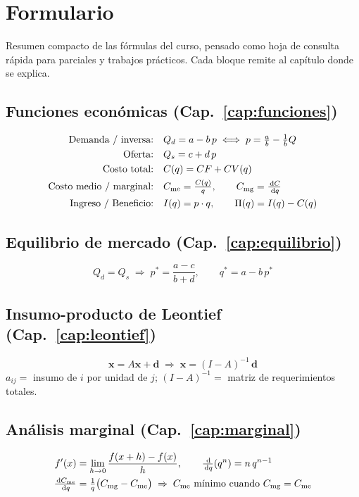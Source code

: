 \chapter{Formulario}
\label{ap:formulario}

Resumen compacto de las fórmulas del curso, pensado como hoja de consulta rápida para parciales y trabajos prácticos. Cada bloque remite al capítulo donde se explica.

\section*{Funciones económicas (Cap.~\ref{cap:funciones})}
\begin{align*}
\text{Demanda / inversa:}\quad & Q_d = a - b\,p \;\Longleftrightarrow\; p = \tfrac{a}{b} - \tfrac{1}{b}Q \\
\text{Oferta:}\quad & Q_s = c + d\,p \\
\text{Costo total:}\quad & C(q) = CF + CV(q) \\
\text{Costo medio / marginal:}\quad & C_{\mathrm{me}} = \tfrac{C(q)}{q}, \qquad C_{\mathrm{mg}} = \tfrac{\,\mathrm{d} C}{\,\mathrm{d} q} \\
\text{Ingreso / Beneficio:}\quad & I(q) = p\cdot q, \qquad \Pi(q) = I(q) - C(q)
\end{align*}

\section*{Equilibrio de mercado (Cap.~\ref{cap:equilibrio})}
\[
Q_d = Q_s \;\Longrightarrow\; p^{*} = \frac{a-c}{b+d}, \qquad q^{*} = a - b\,p^{*}
\]

\section*{Insumo-producto de Leontief (Cap.~\ref{cap:leontief})}
\[
\mathbf{x} = A\mathbf{x} + \mathbf{d} \;\Longrightarrow\; \mathbf{x} = (I - A)^{-1}\,\mathbf{d}
\]
$a_{ij}=$ insumo de $i$ por unidad de $j$; \quad $(I-A)^{-1}=$ matriz de requerimientos totales.

\section*{Análisis marginal (Cap.~\ref{cap:marginal})}
\begin{align*}
f'(x) &= \lim_{h\to 0}\frac{f(x+h)-f(x)}{h}, \qquad
\tfrac{\,\mathrm{d}}{\,\mathrm{d} q}(q^n) = n\,q^{n-1} \\
\tfrac{\,\mathrm{d} C_{\mathrm{me}}}{\,\mathrm{d} q} &= \tfrac{1}{q}\big(C_{\mathrm{mg}} - C_{\mathrm{me}}\big) \;\Rightarrow\; C_{\mathrm{me}} \text{ mínimo cuando } C_{\mathrm{mg}} = C_{\mathrm{me}}
\end{align*}

